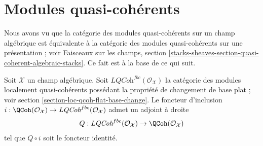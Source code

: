 \section{Modules quasi-cohérents}
\label{section-quasi-coherent}

\noindent
Nous avons vu que la catégorie des modules quasi-cohérents sur un champ
algébrique est équivalente à la catégorie des modules quasi-cohérents sur une
présentation ; voir
Faisceaux sur les champs, section
\ref{stacks-sheaves-section-quasi-coherent-algebraic-stacks}.
Ce fait est à la base de ce qui suit.

\begin{lemma}
\label{lemma-adjoint}
Soit $\mathcal{X}$ un champ algébrique. Soit
$\textit{LQCoh}^{fbc}(\mathcal{O}_\mathcal{X})$
la catégorie des modules localement quasi-cohérents possédant la
propriété de changement de base plat ; voir
section \ref{section-loc-qcoh-flat-base-change}.
Le foncteur d'inclusion
$i : \QCoh(\mathcal{O}_\mathcal{X}) \to
\textit{LQCoh}^{fbc}(\mathcal{O}_\mathcal{X})$
admet un adjoint à droite
$$
Q : \textit{LQCoh}^{fbc}(\mathcal{O}_\mathcal{X}) \to
\QCoh(\mathcal{O}_\mathcal{X})
$$
tel que $Q \circ i$ soit le foncteur identité.
\end{lemma}

